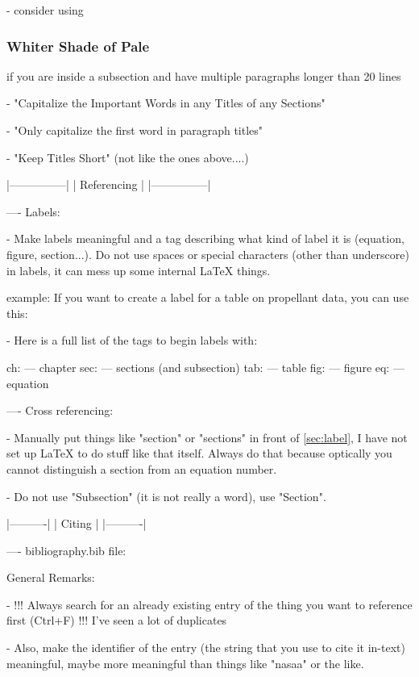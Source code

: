 - consider using \subsubsection{Whiter Shade of Pale} if you are inside a subsection and have multiple paragraphs longer than 20 lines


- "Capitalize the Important Words in any Titles of any Sections"


- "Only capitalize the first word in paragraph titles"


- "Keep Titles Short" (not like the ones above....)






|---------------|
|  Referencing  |
|---------------|

---- Labels:

- Make labels meaningful and a tag describing what kind of label it is (equation, figure, section...). Do not use spaces or special characters (other than underscore) in labels, it can mess up some internal LaTeX things.

example: If you want to create a label for a table on propellant data, you can use this: \label{tab:prop_data}


- Here is a full list of the tags to begin labels with:

ch:   --- chapter
sec:  --- sections (and subsection)
tab:  --- table
fig:  --- figure
eq:   --- equation



---- Cross referencing:

- Manually put things like "section" or "sections" in front of \ref{sec:label}, I have not set up LaTeX to do stuff like that itself. Always do that because optically you cannot distinguish a section from an equation number.


- Do not use "Subsection" (it is not really a word), use "Section".






|----------|
|  Citing  |
|----------|

---- bibliography.bib file:


General Remarks:

- !!! Always search for an already existing entry of the thing you want to reference first (Ctrl+F) !!! I've seen a lot of duplicates


- Also, make the identifier of the entry (the string that you use to cite it in-text) meaningful, maybe more meaningful than things like "nasaa" or the like.


